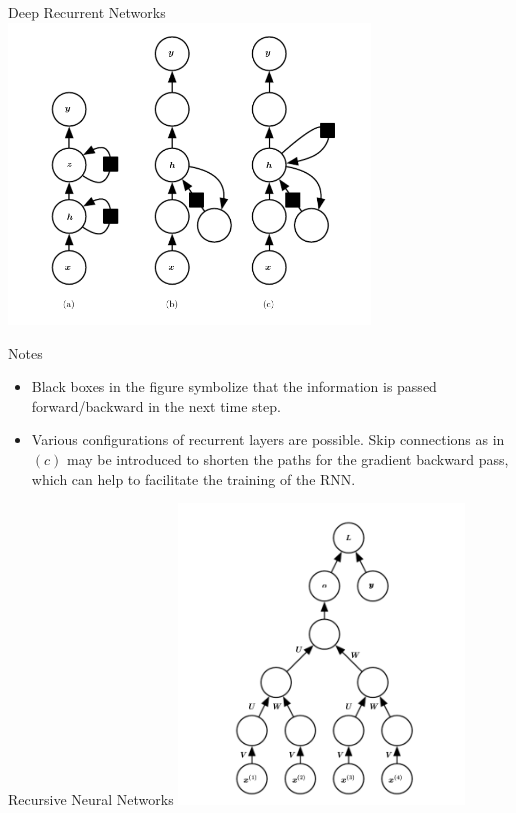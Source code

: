 \begin{frame}{Deep Recurrent Networks}
\centering
\includegraphics[height=8cm]{data/deep-rnn.png}
\end{frame}

\begin{frame}[beamer:0]{Notes}
\begin{itemize}
\item Black boxes in the figure symbolize that the information is passed forward/backward in the next time step.
\item Various configurations of recurrent layers are possible. Skip connections as in $(c)$ may be introduced to shorten the paths for the gradient backward pass, which can help to facilitate the training of the RNN.
\end{itemize}
\end{frame}

\begin{frame}{Recursive Neural Networks}
\centering
\includegraphics[height=8cm]{data/recursive.png}
\end{frame}

